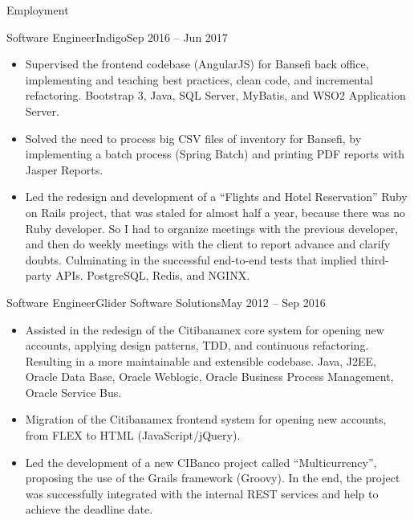 \documentclass[calibri]{../mcdowell-cv/mcdowellcv}
\begin{document}
\begin{cvsection}{Employment}
		\begin{cvsubsection}{Software Engineer}{Indigo}{Sep 2016 -- Jun 2017}		
			\begin{itemize}
				\item Supervised the frontend codebase (AngularJS) for Bansefi back office, implementing and teaching best practices, clean code, and incremental refactoring. Bootstrap 3, Java, SQL Server, MyBatis, and WSO2 Application Server.
				\item Solved the need to process big CSV files of inventory for Bansefi, by implementing a batch process (Spring Batch) and printing PDF reports with Jasper Reports.
				\item Led the redesign and development of a ``Flights and Hotel Reservation'' Ruby on Rails project, that was staled for almost half a year, because there was no Ruby developer. So I had to organize meetings with the previous developer, and then do weekly meetings with the client to report advance and clarify doubts. Culminating in the successful end-to-end tests that implied third-party APIs. PostgreSQL, Redis, and NGINX.
			\end{itemize}
		\end{cvsubsection}

		\begin{cvsubsection}{Software Engineer}{Glider Software Solutions}{May 2012 -- Sep 2016}	
			\begin{itemize}
				\item Assisted in the redesign of the Citibanamex core system for opening new accounts, applying design patterns, TDD, and continuous refactoring. Resulting in a more maintainable and extensible codebase. Java, J2EE, Oracle Data Base, Oracle Weblogic, Oracle Business Process Management, Oracle Service Bus.
				\item Migration of the Citibanamex frontend system for opening new accounts, from FLEX to HTML (JavaScript/jQuery).
				\item Led the development of a new CIBanco project called ``Multicurrency'', proposing the use of the Grails framework (Groovy). In the end, the project was successfully integrated with the internal REST services and help to achieve the deadline date.
			\end{itemize}
		\end{cvsubsection}


\end{cvsection}
\end{document}
